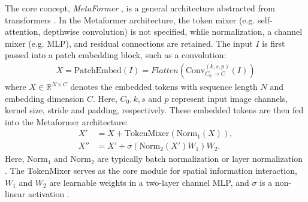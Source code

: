The core concept, \textit{MetaFormer} \cite{yu2022metaformer, yu2023metaformer}, is a general architecture abstracted from transformers \cite{vaswani2017attention}. In the Metaformer architecture, the token mixer (e.g. self-attention, depthwise convolution) is not specified, while normalization, a channel mixer (e.g. MLP), and residual connections \cite{he2016deep} are retained. The input \( I \) is first passed into a patch embedding block, such as a convolution:
\begin{align}
X = \text{PatchEmbed}(I)=Flatten(\text{Conv}^{(k, s, p)}_{C_0 \rightarrow C} (I)) \label{eq1}
\end{align}
where \( X \in \mathbb{R}^{N \times C} \) denotes the embedded tokens with sequence length \( N \) and embedding dimension \( C \). Here, $C_0, k, s$ and $p$ represent input image channels, kernel size, stride and padding, respectively. These embedded tokens are then fed into the Metaformer architecture: 
\begin{align}
X' &= X + \text{TokenMixer}(\text{Norm}_1(X)), \label{eq2} \\
X'' &= X' + \sigma(\text{Norm}_2(X')W_1)W_2. \label{eq3}
\end{align}
Here, $\text{Norm}_1$ and $\text{Norm}_2$ are typically batch normalization \cite{ioffe2015batch} or layer normalization \cite{ba2016layer}. The TokenMixer serves as the core module for spatial information interaction, $W_1$ and $W_2$ are learnable weights in a two-layer channel MLP, and $\sigma$ is a non-linear activation \cite{nair2010rectified, hendrycks2016gaussian}. 




